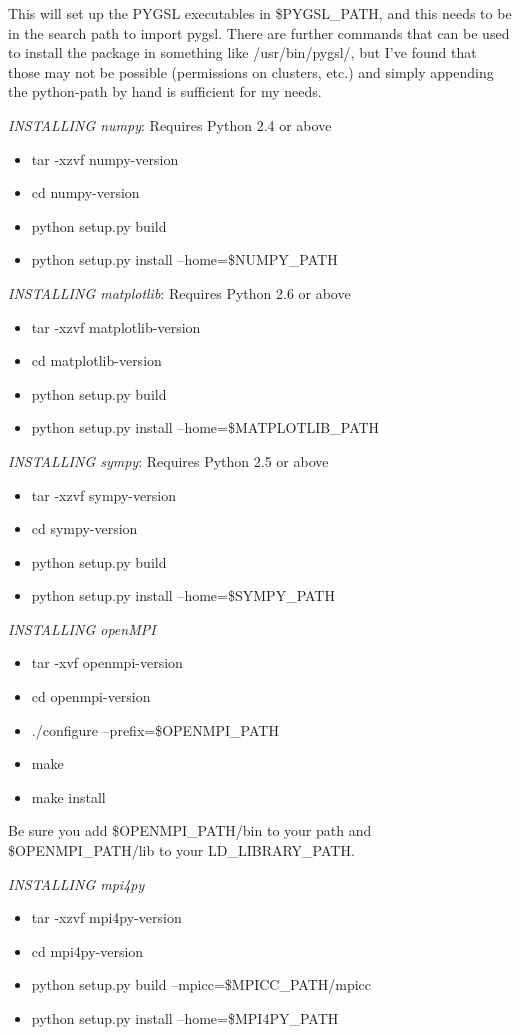 This will set up the PYGSL executables in \$PYGSL\_PATH, and this needs to be in the search path to import pygsl. There are further commands that can be used to install the package in something like /usr/bin/pygsl/, but I've found that those may not be possible (permissions on clusters, etc.) and simply appending the python-path by hand is sufficient for my needs.

\emph{INSTALLING numpy}:
Requires Python 2.4 or above
\begin{itemize}
  \item{tar -xzvf numpy-version}
  \item{cd numpy-version}
  \item{python setup.py build}
  \item{python setup.py install --home=\$NUMPY\_PATH}
\end{itemize}


\emph{INSTALLING matplotlib}:
Requires Python 2.6 or above
\begin{itemize}
  \item{tar -xzvf matplotlib-version}
  \item{cd matplotlib-version}
  \item{python setup.py build}
  \item{python setup.py install --home=\$MATPLOTLIB\_PATH}
\end{itemize}


\emph{INSTALLING sympy}:
Requires Python 2.5 or above
\begin{itemize}
  \item{tar -xzvf sympy-version}
  \item{cd sympy-version}
  \item{python setup.py build}
  \item{python setup.py install --home=\$SYMPY\_PATH}
\end{itemize}


\emph{INSTALLING openMPI}
\begin{itemize}
  \item{tar -xvf openmpi-version}
  \item{cd openmpi-version}
  \item{./configure --prefix=\$OPENMPI\_PATH}
  \item{make}
  \item{make install}
\end{itemize}

Be sure you add \$OPENMPI\_PATH/bin to your path and \$OPENMPI\_PATH/lib to your LD\_LIBRARY\_PATH.

\emph{INSTALLING mpi4py}
\begin{itemize}
  \item{tar -xzvf mpi4py-version}
  \item{cd mpi4py-version}
  \item{python setup.py build --mpicc=\$MPICC\_PATH/mpicc}
  \item{python setup.py install --home=\$MPI4PY\_PATH}
\end{itemize}


